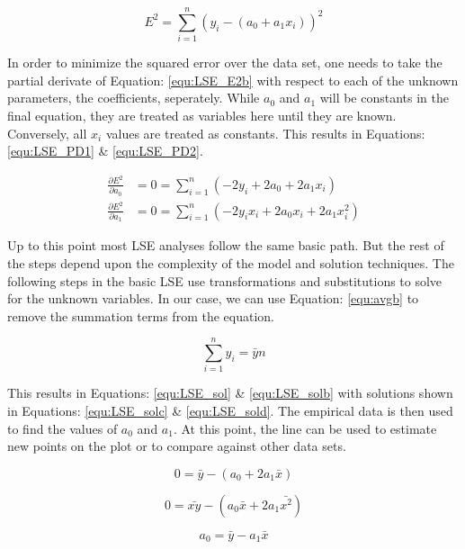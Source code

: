 \begin{equation}
    \label{equ:LSE_E2b}
    E^2 = \sum_{i=1}^{n} (y_i - (a_0 + a_1 x_i))^2
\end{equation}

In order to minimize the squared error over the data set, one needs to take the partial derivate of Equation: \eqref{equ:LSE_E2b} with respect to each of the unknown parameters, the coefficients, seperately. While $a_0$ and $a_1$ will be constants in the final equation, they are treated as variables here until they are known. Conversely, all $x_i$ values are treated as constants. This results in Equations: \eqref{equ:LSE_PD1} \& \eqref{equ:LSE_PD2}.

\begin{align} 
    \frac{\partial E^2}{\partial a_0} &= 0 = \sum_{i=1}^{n} (-2y_i +2a_0 + 2a_1 x_i)           \label{equ:LSE_PD1} \\
    \frac{\partial E^2}{\partial a_1} &= 0 = \sum_{i=1}^{n} (-2y_i x_i +2a_0 x_i + 2a_1 x_i^2) \label{equ:LSE_PD2}
\end{align}

Up to this point most LSE analyses follow the same basic path. But the rest of the steps depend upon the complexity of the model and solution techniques. The following steps in the basic LSE use transformations and substitutions to solve for the unknown variables. In our case, we can use Equation: \eqref{equ:avgb} to remove the summation terms from the equation.

\begin{equation}
    \label{equ:avgb} 
    \sum_{i=1}^{n} y_i  = \bar{y}n
\end{equation}

This results in Equations: \eqref{equ:LSE_sol} \& \eqref{equ:LSE_solb} with solutions shown in Equations: \eqref{equ:LSE_solc} \& \eqref{equ:LSE_sold}. The empirical data is then used to find the values of $a_0$ and $a_1$. At this point, the line can be used to estimate new points on the plot or to compare against other data sets.

\begin{equation}
    \label{equ:LSE_sol}
    0 = \bar{y} - (a_0 + 2a_1 \bar{x})
\end{equation}

\begin{equation}
    \label{equ:LSE_solb}
    0 = \bar{xy} - (a_0 \bar{x} + 2a_1 \bar{x^2})
\end{equation}

\begin{equation}
    \label{equ:LSE_solc}
    a_0 = \bar{y} - a_1 \bar{x}
\end{equation}

